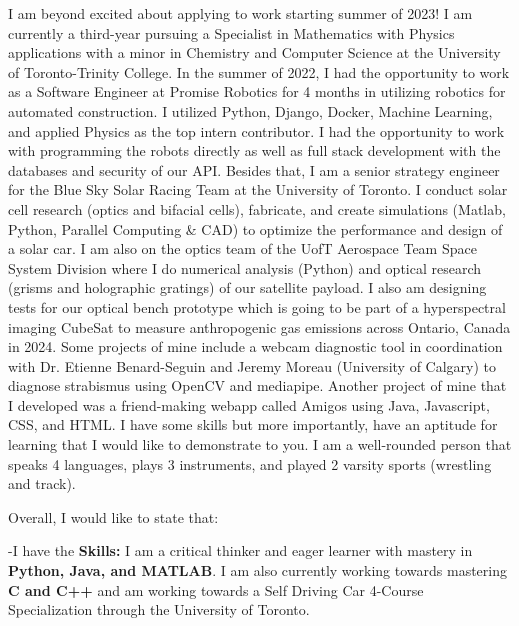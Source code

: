 \documentclass[11pt,a4]{article}
\newcommand{\bold}[1]{ {\bfseries #1}}
\begin{document}
I am beyond excited about applying to work starting summer of 2023! 
I am currently a third-year pursuing a Specialist in
 Mathematics with Physics applications with a minor 
 in Chemistry and Computer Science at the University
  of Toronto-Trinity College. In the summer of 2022,
   I had the opportunity to work as a Software Engineer
    at Promise Robotics for 4 months in utilizing robotics
     for automated construction. I utilized Python, Django,
      Docker, Machine Learning, and applied Physics as the
       top intern contributor. I had the opportunity to work
        with programming the robots directly as well as full 
        stack development with the databases and security of
         our API. Besides that, I am a senior strategy 
         engineer for the Blue Sky Solar Racing Team at 
         the University of Toronto. I conduct solar cell
          research (optics and bifacial cells), fabricate,
           and create simulations (Matlab, Python, Parallel 
           Computing & CAD) to optimize the performance and
            design of a solar car. I am also on the optics 
            team of the UofT Aerospace Team Space System
             Division where I do numerical analysis (Python) 
             and optical research (grisms and holographic 
             gratings) of our satellite payload. I also am 
             designing tests for our optical bench prototype
              which is going to be part of a hyperspectral 
              imaging CubeSat to measure anthropogenic gas 
              emissions across Ontario, Canada in 2024.
               Some projects of mine include a webcam 
               diagnostic tool in coordination with Dr.
                Etienne Benard-Seguin and Jeremy Moreau
                 (University of Calgary) to diagnose 
                 strabismus using OpenCV and mediapipe. 
                 Another project of mine that I developed
                  was a friend-making webapp called Amigos
                   using Java, Javascript, CSS, and HTML.
                    I have some skills but more importantly,
                     have an aptitude for learning that I 
                     would like to demonstrate to you. I am
                      a well-rounded person that speaks 4
                      languages, plays 3 instruments, and 
                      played 2 varsity sports (wrestling and 
                      track). \par
     Overall, I would like to state that:


-I have the \bold{Skills:} I am a critical thinker and eager learner with mastery in
\bold{Python, Java, and MATLAB}. I am also currently working towards mastering
\bold{C and C++} and am working towards a Self Driving Car 4-Course Specialization
through the University of Toronto.\par
\end{document}
